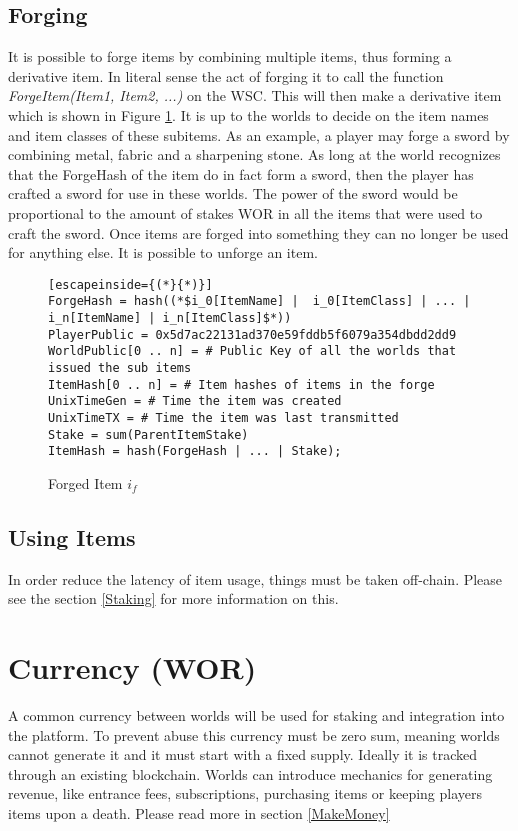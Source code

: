 \documentclass[runningheads,a4paper]{llncs}
\begin{document}
\subsection{Forging}
It is possible to forge items by combining multiple items, thus forming a derivative item. In literal sense the act of forging it to call the function \textit{ForgeItem(Item1, Item2, ...)} on the WSC. This will then make a derivative item which is shown in Figure \ref{ForgedItem}. It is up to the worlds to decide on the item names and item classes of these subitems. As an example, a player may forge a sword by combining metal, fabric and a sharpening stone. As long at the world recognizes that the ForgeHash of the item do in fact form a sword, then the player has crafted a sword for use in these worlds. The power of the sword would be proportional to the amount of stakes WOR in all the items that were used to craft the sword. Once items are forged into something they can no longer be used for anything else. It is possible to unforge an item.

\begin{figure}[H]
\centering
\caption{Forged Item $i_f$}
\label{ForgedItem}
\begin{lstlisting}[escapeinside={(*}{*)}]
ForgeHash = hash((*$i_0[ItemName] |  i_0[ItemClass] | ... | i_n[ItemName] | i_n[ItemClass]$*))
PlayerPublic = 0x5d7ac22131ad370e59fddb5f6079a354dbdd2dd9
WorldPublic[0 .. n] = # Public Key of all the worlds that issued the sub items
ItemHash[0 .. n] = # Item hashes of items in the forge
UnixTimeGen = # Time the item was created
UnixTimeTX = # Time the item was last transmitted
Stake = sum(ParentItemStake)
ItemHash = hash(ForgeHash | ... | Stake);
\end{lstlisting}
\end{figure}

\subsection{Using Items}
In order reduce the latency of item usage, things must be taken off-chain. Please see the section \ref{Staking} for more information on this.

\section{Currency (WOR)}
\label{money}
A common currency between worlds will be used for staking and integration into the platform. To prevent abuse this currency must be zero sum, meaning worlds cannot generate it and it must start with a fixed supply. Ideally it is tracked through an existing blockchain. Worlds can introduce mechanics for generating revenue, like entrance fees, subscriptions, purchasing items or keeping players items upon a death. Please read more in section \ref{MakeMoney}
\end{document}
